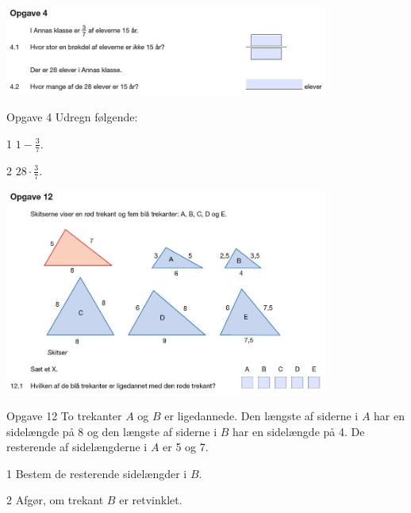 \begin{center}
	\includegraphics[width= 0.8\textwidth]{Billeder/opg4fsk}
\end{center}

\begin{opgavetekst}{Opgave 4}
	Udregn følgende:
\end{opgavetekst}

\begin{delopgave}{}{1}
	$1-\frac{3}{7}$.
\end{delopgave}
\begin{delopgave}{}{2}
	$28\cdot \frac{3}{7}$.
\end{delopgave}

\newpage
\begin{center}
	\includegraphics[width = 0.8\textwidth]{Billeder/opg12fsk}
\end{center}

\begin{opgavetekst}{Opgave 12}
	To trekanter $A$ og $B$ er ligedannede. Den længste af siderne i $A$ har en sidelængde 
	på 8 og den længste af siderne i $B$ har en sidelængde på 4. De resterende af sidelængderne
	i $A$ er 5 og 7. 
\end{opgavetekst}
\begin{delopgave}{}{1}
	Bestem de resterende sidelængder i $B$. 
\end{delopgave}
\begin{delopgave}{}{2}
	Afgør, om trekant $B$ er retvinklet. 
\end{delopgave}


